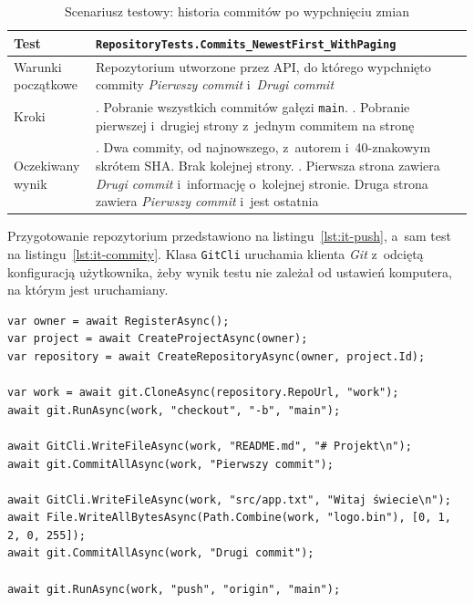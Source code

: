 \begin{table}[htb]
    \centering
    \caption{Scenariusz testowy: historia commitów po wypchnięciu zmian}
    \label{tab:it-commity}
    \small
    \begin{tabularx}{\linewidth}{@{}>{\raggedright\arraybackslash}p{3.5cm} >{\raggedright\arraybackslash}X@{}}
        \hline
        Test & \texttt{RepositoryTests.\allowbreak{}Commits\_\allowbreak{}NewestFirst\_\allowbreak{}WithPaging} \\ \hline
        Warunki początkowe & Repozytorium utworzone przez API, do którego wypchnięto commity \textit{Pierwszy commit} i~\textit{Drugi commit} \\ \hline
        Kroki & 1. Pobranie wszystkich commitów gałęzi \texttt{main}. \newline 2. Pobranie pierwszej i~drugiej strony z~jednym commitem na stronę \\ \hline
        Oczekiwany wynik & 1. Dwa commity, od najnowszego, z~autorem i~40-znakowym skrótem SHA. Brak kolejnej strony. \newline 2. Pierwsza strona zawiera \textit{Drugi commit} i~informację o~kolejnej stronie. Druga strona zawiera \textit{Pierwszy commit} i~jest ostatnia \\ \hline
    \end{tabularx}
\end{table}

Przygotowanie repozytorium przedstawiono na listingu~\ref{lst:it-push}, a~sam test na listingu~\ref{lst:it-commity}.
Klasa \texttt{GitCli} uruchamia klienta \textit{Git} z~odciętą konfiguracją użytkownika, żeby wynik testu nie zależał
od ustawień komputera, na którym jest uruchamiany.

\begin{lstlisting}[basicstyle=\footnotesize\ttfamily, captionpos=t, caption={Przygotowanie repozytorium z~dwoma wypchniętymi commitami}, label={lst:it-push}]
var owner = await RegisterAsync();
var project = await CreateProjectAsync(owner);
var repository = await CreateRepositoryAsync(owner, project.Id);

var work = await git.CloneAsync(repository.RepoUrl, "work");
await git.RunAsync(work, "checkout", "-b", "main");

await GitCli.WriteFileAsync(work, "README.md", "# Projekt\n");
await git.CommitAllAsync(work, "Pierwszy commit");

await GitCli.WriteFileAsync(work, "src/app.txt", "Witaj świecie\n");
await File.WriteAllBytesAsync(Path.Combine(work, "logo.bin"), [0, 1, 2, 0, 255]);
await git.CommitAllAsync(work, "Drugi commit");

await git.RunAsync(work, "push", "origin", "main");
\end{lstlisting}

